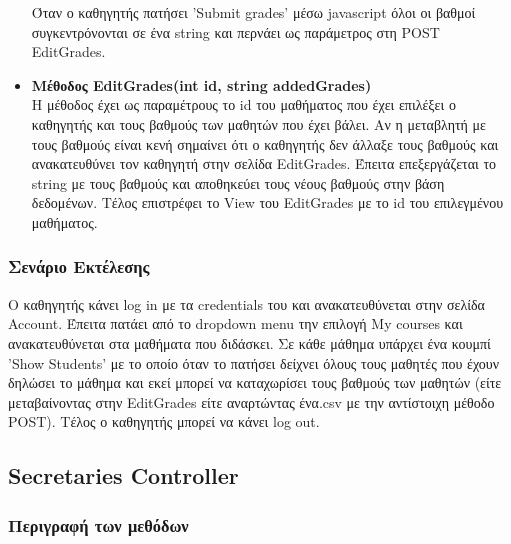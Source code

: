 \documentclass[12pt]{article}
\begin{document}
\begin{itemize}
	Όταν ο καθηγητής πατήσει 'Submit grades' μέσω javascript όλοι οι βαθμοί συγκεντρόνονται σε ένα string και περνάει ως παράμετρος στη POST EditGrades.
	
	\item \textbf{Μέθοδος EditGrades(int id, string addedGrades)}\\
	Η μέθοδος έχει ως παραμέτρους το id  του μαθήματος που έχει επιλέξει ο καθηγητής και τους βαθμούς των μαθητών που έχει βάλει. Αν η μεταβλητή με τους βαθμούς είναι κενή σημαίνει ότι ο καθηγητής δεν άλλαξε τους βαθμούς και ανακατευθύνει τον καθηγητή στην σελίδα EditGrades. Έπειτα επεξεργάζεται το string με τους βαθμούς και αποθηκεύει τους νέους βαθμούς στην βάση δεδομένων. Τέλος επιστρέφει το View του EditGrades με το id του επιλεγμένου μαθήματος.		
				
\end{itemize}

\subsubsection{Σενάριο Εκτέλεσης}
Ο καθηγητής κάνει log in με τα credentials του και ανακατευθύνεται στην σελίδα Account. Έπειτα πατάει από το dropdown menu την επιλογή My courses και ανακατευθύνεται στα μαθήματα που διδάσκει. Σε κάθε μάθημα υπάρχει ένα κουμπί 'Show Students' με το οποίο όταν το πατήσει δείχνει όλους τους μαθητές που έχουν δηλώσει το μάθημα και εκεί μπορεί να καταχωρίσει τους βαθμούς των μαθητών (είτε μεταβαίνοντας στην EditGrades είτε αναρτώντας ένα.csv με την αντίστοιχη μέθοδο POST). Τέλος ο καθηγητής μπορεί να κάνει log out.

\subsection{Secretaries Controller}

\subsubsection{Περιγραφή των μεθόδων}
\end{document}
